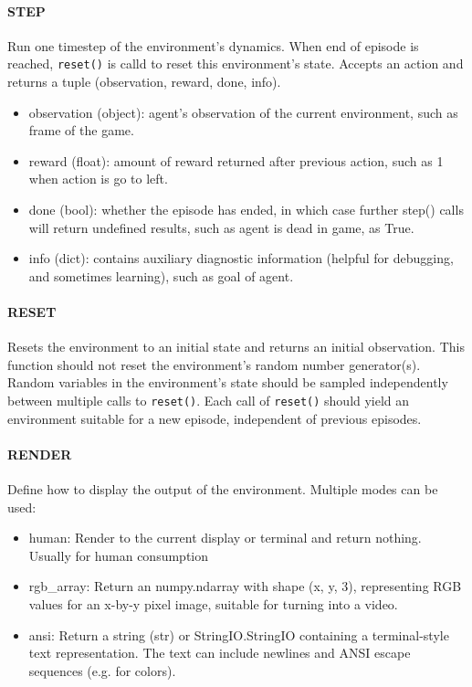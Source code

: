 \paragraph{STEP} Run one timestep of the environment's dynamics. When end of episode is reached, \texttt{reset()} is calld to reset this environment's state. Accepts an action and returns a tuple (observation, reward, done, info).
\begin{itemize}
\item observation (object): agent's observation of the current environment, such as frame of the game.
\item reward (float): amount of reward returned after previous action, such as 1 when action is go to left.
\item done (bool): whether the episode has ended, in which case further step() calls will return undefined results, such as agent is dead in game, as True.
\item info (dict): contains auxiliary diagnostic information (helpful for debugging, and sometimes learning), such as goal of agent.
\end{itemize}

\paragraph{RESET} Resets the environment to an initial state and returns an initial observation. This function should not reset the environment's random number generator(s). Random variables in the environment's state should be sampled independently between multiple calls to \texttt{reset()}. Each call of \texttt{reset()} should yield an environment suitable for a new episode, independent of previous episodes.
\paragraph{RENDER} Define how to display the output of the environment. Multiple modes can be used: 
\begin{itemize}
	\item human: Render to the current display or terminal and return nothing. Usually for human consumption
	\item rgb\_array: Return an numpy.ndarray with shape (x, y, 3), representing RGB values for an x-by-y pixel image, suitable for turning into a video.
	\item ansi: Return a string (str) or StringIO.StringIO containing a terminal-style text representation. The text can include newlines and ANSI escape sequences (e.g. for colors).
\end{itemize}


